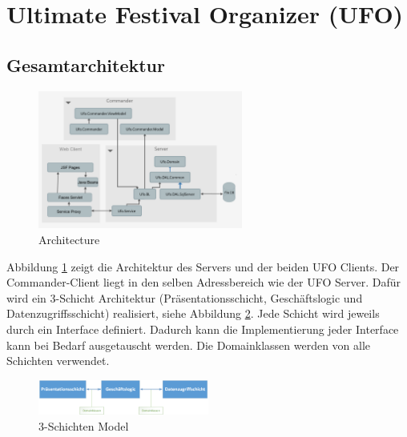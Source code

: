 \documentclass[12pt, a4paper]{article}
\author{Rotaru Daniel}
\begin{document}
\section{Ultimate Festival Organizer (UFO)}

\subsection{Gesamtarchitektur}

\begin{figure}[h] 	
	\centering
		\includegraphics[width=0.6\textwidth]{Architecture.png}
	\caption{Architecture}
	\label{fig:architecture}
\end{figure}

Abbildung \ref{fig:architecture} zeigt die Architektur des Servers und der beiden UFO Clients. Der Commander-Client  liegt in den selben Adressbereich wie der UFO Server. Dafür wird ein 3-Schicht Architektur (Präsentationsschicht, Geschäftslogic und Datenzugriffsschicht) realisiert, siehe Abbildung \ref{fig:schichten}. Jede Schicht wird jeweils durch ein Interface definiert. Dadurch kann die Implementierung jeder Interface kann bei Bedarf ausgetauscht werden. Die Domainklassen werden von alle Schichten verwendet.

\begin{figure}[h] 	
	\centering
		\includegraphics[width=0.5\textwidth]{Layers.png}
	\caption{3-Schichten Model}
	\label{fig:schichten}
\end{figure}
\end{document}
